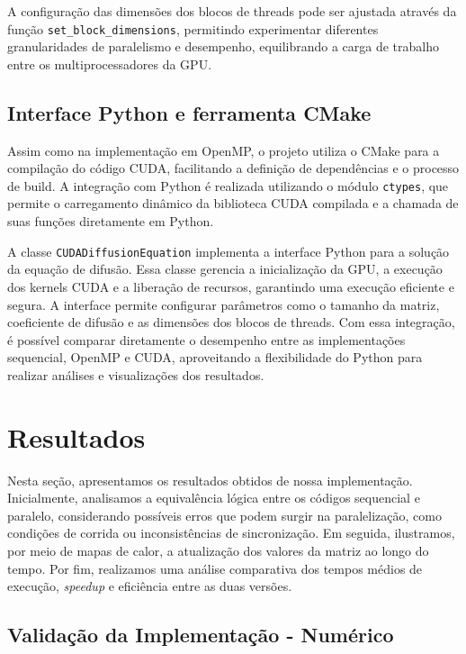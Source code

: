 \documentclass[12pt]{article}
\begin{document}
A configuração das dimensões dos blocos de threads pode ser ajustada através da
função \texttt{set\_block\_dimensions}, permitindo experimentar diferentes
granularidades de paralelismo e desempenho, equilibrando a carga de trabalho
entre os multiprocessadores da GPU.

\subsection{Interface Python e ferramenta CMake}

Assim como na implementação em OpenMP, o projeto utiliza o CMake para a
compilação do código CUDA, facilitando a definição de dependências e o processo
de build. A integração com Python é realizada utilizando o módulo
\texttt{ctypes}, que permite o carregamento dinâmico da biblioteca CUDA
compilada e a chamada de suas funções diretamente em Python.

A classe \texttt{CUDADiffusionEquation} implementa a interface Python para a
solução da equação de difusão. Essa classe gerencia a inicialização da GPU, a
execução dos kernels CUDA e a liberação de recursos, garantindo uma execução
eficiente e segura. A interface permite configurar parâmetros como o tamanho da
matriz, coeficiente de difusão e as dimensões dos blocos de threads. Com essa
integração, é possível comparar diretamente o desempenho entre as
implementações sequencial, OpenMP e CUDA, aproveitando a flexibilidade do
Python para realizar análises e visualizações dos resultados.

\section{Resultados}

Nesta seção, apresentamos os resultados obtidos de nossa implementação.
Inicialmente, analisamos a equivalência lógica entre os códigos sequencial e
paralelo, considerando possíveis erros que podem surgir na paralelização, como
condições de corrida ou inconsistências de sincronização. Em seguida,
ilustramos, por meio de mapas de calor, a atualização dos valores da matriz ao
longo do tempo. Por fim, realizamos uma análise comparativa dos tempos médios
de execução, \textit{speedup} e eficiência entre as duas versões.

\subsection{Validação da Implementação - Numérico}
\end{document}
